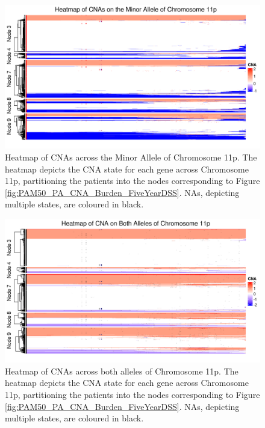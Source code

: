 \begin{figure}[!htb]
\centering
\includegraphics[width = 1\textwidth]{../figures/Chapter_6/Heatmap_Chr11p_Genes_Minor.png}
\caption[Heatmap of CNAs across the Minor Allele of Chromosome 11p]{Heatmap of CNAs across the Minor Allele of Chromosome 11p. The heatmap depicts the CNA state for each gene across Chromosome 11p, partitioning the patients into the nodes corresponding to Figure \ref{fig:PAM50_PA_CNA_Burden_FiveYearDSS}. NAs, depicting multiple states, are coloured in black.}
\label{fig:heatmap_Minor_11p}
\end{figure}

\begin{figure}[!htb]
\centering
\includegraphics[width = 1\textwidth]{../figures/Chapter_6/Heatmap_Chr11p_Genes_Both_Alleles.png}
\caption[Heatmap of CNAs across both alleles of Chromosome 11p]{Heatmap of CNAs across both alleles of Chromosome 11p. The heatmap depicts the CNA state for each gene across Chromosome 11p, partitioning the patients into the nodes corresponding to Figure \ref{fig:PAM50_PA_CNA_Burden_FiveYearDSS}. NAs, depicting multiple states, are coloured in black.}
\label{fig:heatmap_Both_11p}
\end{figure}

